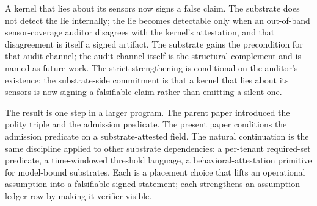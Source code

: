 A kernel that lies about its sensors now signs a false claim. The substrate does not detect the lie internally; the lie becomes detectable only when an out-of-band sensor-coverage auditor disagrees with the kernel's attestation, and that disagreement is itself a signed artifact. The substrate gains the precondition for that audit channel; the audit channel itself is the structural complement and is named as future work. The strict strengthening is conditional on the auditor's existence; the substrate-side commitment is that a kernel that lies about its sensors is now signing a falsifiable claim rather than emitting a silent one.

The result is one step in a larger program. The parent paper introduced the polity triple and the admission predicate. The present paper conditions the admission predicate on a substrate-attested field. The natural continuation is the same discipline applied to other substrate dependencies: a per-tenant required-set predicate, a time-windowed threshold language, a behavioral-attestation primitive for model-bound substrates. Each is a placement choice that lifts an operational assumption into a falsifiable signed statement; each strengthens an assumption-ledger row by making it verifier-visible.
